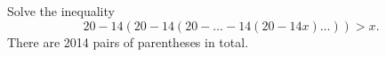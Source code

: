 \problem
Solve the inequality
\[
    20 - 14 (20 - 14 (20 - \ldots - 14 (20 - 14x) \ldots )) > x
.\]
There are 2014 pairs of parentheses in total.
\solution
\endproblem
